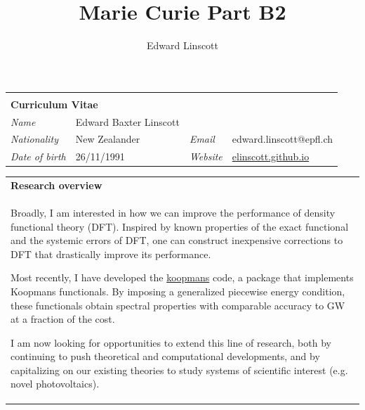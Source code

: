 \documentclass[10pt,a4paper,final]{article}
\author{Edward Linscott}
\title{Marie Curie Part B2}
\begin{document}
\begin{tabularx}{\textwidth}{
      m{}%
      m{}%
      m{}%
      m{}}
   \multicolumn{4}{l}{\cellcolor{seaborn_red}}                                                                                   \\[-1.5em]
   \multicolumn{4}{l}{\cellcolor{seaborn_red}%
      \Huge\textbf{\textcolor{seaborn_bg_grey_half}{Curriculum Vitae}%
      }}                                                                                                                         \\
   \textit{Name         } & Edward Baxter Linscott &                  &                                                          \\
   \textit{Nationality  } & New Zealander          & \textit{Email  } & edward.linscott@epfl.ch                                  \\
   \textit{Date of birth} & 26/11/1991             & \textit{Website} & \href{https://elinscott.github.io/}{elinscott.github.io} \\
\end{tabularx}

\begin{tabularx}{\textwidth}{X}
   \cellcolor{seaborn_blue}\large\textbf{\textcolor{seaborn_bg_grey_half}{Research overview}} \\
   Broadly, I am interested in how we can improve the performance of density functional theory (DFT). Inspired by known properties of the exact functional and the systemic errors of DFT, one can construct inexpensive corrections to DFT that drastically improve its performance.

   Most recently, I have developed the \href{https://koopmans-functionals.org/}{koopmans} code, a package that implements Koopmans functionals. By imposing a generalized piecewise energy condition, these functionals obtain spectral properties with comparable accuracy to GW at a fraction of the cost.

   I am now looking for opportunities to extend this line of research, both by continuing to push theoretical and computational developments, and by capitalizing on our existing theories to study systems of scientific interest (e.g. novel photovoltaics).
\end{tabularx}

\setlength{\fboxsep}{5pt}%
\setlength{\fboxrule}{0pt}
\end{document}
